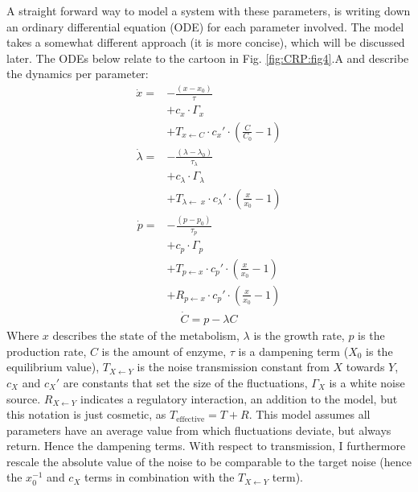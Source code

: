A straight forward way to model a system with these parameters, is writing down an ordinary differential equation (ODE) for each parameter involved. 
%
The  model takes a somewhat different approach (it is more concise), which will be discussed later.
%
The ODEs below relate to the cartoon in Fig. \ref{fig:CRP:fig4}.A
and describe the dynamics per parameter:
%
\begin{align}
\label{myfirstequation}
\dot{x} = & - \frac{(x-x_0)}{\tau}  \nonumber \\ 
          & + c_x \cdot \Gamma_x  \nonumber \\ %
          & + T_{x\leftarrow C} \cdot c_x' \cdot (\frac{C}{C_0} - 1)  
\end{align}
%
%
\begin{align}
	\dot{\lambda} = & -\frac{(\lambda - \lambda_0 )}{\tau_\lambda} \nonumber \\ 
 			& + c_\lambda \cdot \Gamma_\lambda \nonumber \\  %
			& + T_{\lambda\leftarrow\ x} \cdot c_\lambda' \cdot (\frac{x}{x_0}-1) 
\end{align}
%
\begin{align}
\label{mythirdequation}
\dot{p} = & - \frac{(p-p_0)}{\tau_p} \nonumber \\ 
		 & + c_p \cdot \Gamma_p \nonumber \\ 
         & + T_{p\leftarrow x} \cdot c_p' \cdot (\frac{x}{x_0}-1)  \nonumber \\ 
         & + R_{p\leftarrow x} \cdot c_p' \cdot (\frac{x}{x_0}-1)
\end{align}
%
\begin{align}
\label{mylastequation}
\dot{C} = p - \lambda C
\end{align}
%
Where $x$ describes the state of the metabolism, $\lambda$ is the growth rate, $p$ is the production rate, $C$ is the amount of enzyme, $\tau$ is a dampening term ($X_0$ is the equilibrium value), $T_{X \leftarrow Y}$ is the noise transmission constant from $X$ towards $Y$, $c_X$ and $c_X'$ are constants that set the size of the fluctuations, $\Gamma_X$ is a white noise source.
$R_{X \leftarrow Y}$ indicates a regulatory interaction, an addition to the model, but this notation is just cosmetic, as $T_\text{effective}=T+R$.
%
This model assumes all parameters have an average value from which fluctuations deviate, but always return. Hence the dampening terms.
With respect to transmission, I furthermore rescale the absolute value of the noise to be comparable to the target noise (hence the $x_0^{-1}$ and $c_X$ terms in combination with the $T_{X\leftarrow Y}$ term).

